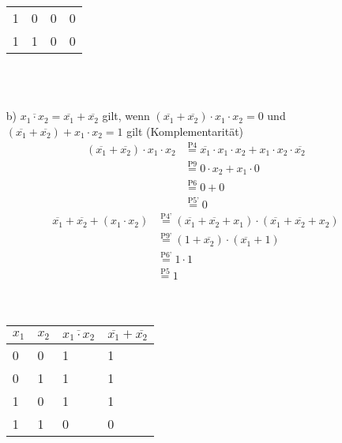 \documentclass{article}
\begin{document}
\begin{itemize}
\begin{tabular}{l|l|l|l}
    		1&0&0&0 \\
    		1&1&0&0
    	\end{tabular}\\\\
    	\item[b)] $\overline{x_1 \cdot x_2} = \overline{x_1} + \overline{x_2}$ gilt, wenn $(\overline{x_1} + \overline{x_2}) \cdot x_1 \cdot x_2 = 0$ und $(\overline{x_1} + \overline{x_2}) + x_1 \cdot x_2 = 1$ gilt (Komplementarität)
    	\begin{align*}
    		(\overline{x_1} + \overline{x_2}) \cdot x_1 \cdot x_2 & \stackrel{\text{P4}}{=} \overline{x_1} \cdot x_1 \cdot x_2 + x_1 \cdot x_2 \cdot \overline{x_2} \\
    		& \stackrel{\text{P9}}{=} 0 \cdot x_2 + x_1 \cdot 0 \\
    		& \stackrel{\text{P6}}{=} 0 + 0 \\
    		& \stackrel{\text{P5'}}{=} 0
    	\end{align*}
    	\begin{align*}
    		\overline{x_1} + \overline{x_2} + (x_1 \cdot x_2) & \stackrel{\text{P4'}}{=} (\overline{x_1} + \overline{x_2} + x_1) \cdot (\overline{x_1} + \overline{x_2} + x_2) \\
    		& \stackrel{\text{P9'}}{=} (1 + \overline{x_2}) \cdot (\overline{x_1} + 1) \\
    		& \stackrel{\text{P6'}}{=} 1 \cdot 1 \\
    		& \stackrel{\text{P5}}{=} 1
    	\end{align*}\\\\
    	\begin{tabular}{l|l|l|l}
    		$x_1$ & $x_2$ & $\overline{x_1 \cdot x_2}$ & $\overline{x_1} + \overline{x_2}$ \\
    		\hline
    		0&0&1&1 \\
    		0&1&1&1 \\
    		1&0&1&1 \\
    		1&1&0&0
    	\end{tabular}\\\\
    \end{itemize}
    
\end{document}
